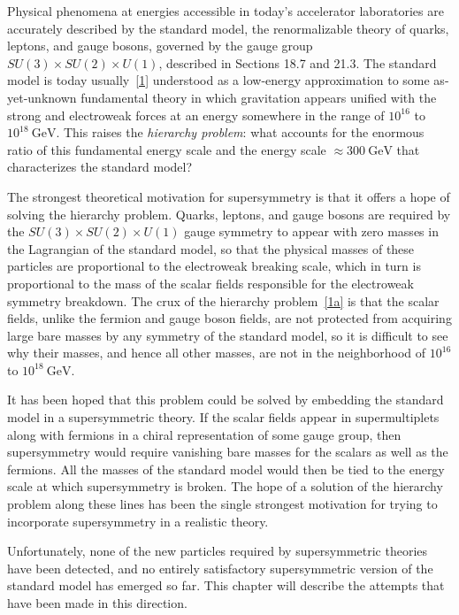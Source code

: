 
Physical phenomena at energies accessible in today's accelerator
laboratories are accurately described by the standard model, the
renormalizable theory of quarks, leptons, and gauge bosons, governed by
the gauge group \(SU(3)\times SU(2)\times U(1)\),
described in Sections 18.7 and 21.3. The standard model is today
usually~\hyperref[ch28-ref-1]{[1]} understood as a low-energy
approximation to some as-yet-unknown fundamental theory in which
gravitation appears unified with the strong and electroweak forces at an
energy somewhere in the range of \(10^{16}\) to \(10^{18}\ \mathrm{GeV}\).
This raises the \textit{hierarchy problem}: what accounts for the enormous
ratio of this fundamental energy scale and the energy scale
\(\approx 300\ \mathrm{GeV}\) that characterizes the standard model?

The strongest theoretical motivation for supersymmetry is that it offers
a hope of solving the hierarchy problem. Quarks, leptons, and gauge
bosons are required by the
\(SU(3)\times SU(2)\times U(1)\) gauge symmetry to appear
with zero masses in the Lagrangian of the standard model, so that the
physical masses of these particles are proportional to the electroweak
breaking scale, which in turn is proportional to the mass of the scalar
fields responsible for the electroweak symmetry breakdown. The crux of
the hierarchy problem~\hyperref[ch28-ref-1a]{[1a]} is that the scalar
fields, unlike the fermion and gauge boson fields, are not protected from
acquiring large bare masses by any symmetry of the standard model, so it
is difficult to see why their masses, and hence all other masses, are not
in the neighborhood of \(10^{16}\) to \(10^{18}\ \mathrm{GeV}\).

It has been hoped that this problem could be solved by embedding the
standard model in a supersymmetric theory. If the scalar fields appear in
supermultiplets along with fermions in a chiral representation of some
gauge group, then supersymmetry would require vanishing bare masses for
the scalars as well as the fermions. All the masses of the standard model
would then be tied to the energy scale at which supersymmetry is broken.
The hope of a solution of the hierarchy problem along these lines has
been the single strongest motivation for trying to incorporate
supersymmetry in a realistic theory.

Unfortunately, none of the new particles required by supersymmetric
theories have been detected, and no entirely satisfactory supersymmetric
version of the standard model has emerged so far. This chapter will
describe the attempts that have been made in this direction.

